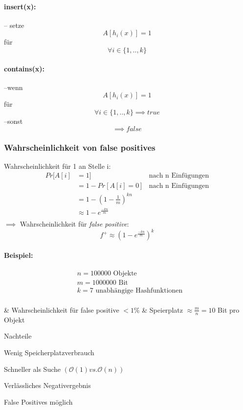 \documentclass[a4paper]{scrartcl}
\begin{document}
	\paragraph{insert(x):}
	-- setze \[A [h_i (x)] = 1 \] für \[ \forall i \in \{1,..,k \} \]
	
	\paragraph{contains(x):}
	--wenn \[ A [h_i (x)] = 1 \] für \[ \forall i \in \{1,..,k\} \implies true \] --sonst \[ \implies false \]
	
	\subsubsection{Wahrscheinlichkeit von false positives}
	Wahrscheinlichkeit für 1 an Stelle i:\\
	\begin{align*}
		Pr[A[i] &= 1] & \text{nach n Einfügungen}\\
		&= 1 - Pr[A[i] = 0] & \text{nach n Einfügungen}\\
		&= 1 - ( 1 - \frac{1}{m} )^{kn}\\
		&\approx 1 - e^{\frac{-kn}{m}}\\ 
	\end{align*}
	\(\implies\) Wahrscheinlichkeit für \emph{false positive}: \[ f^+ \approx (1 - e ^{\frac{-kn}{m}})^k \]
	
	\paragraph{Beispiel:}
	\begin{align*}
		&n = 100 000 \text{ Objekte}\\
		&m = 1 000 000 \text{ Bit} \\
		&k = 7 \text{ unabhängige Hashfunktionen}\\
	\end{align*}
	\begin{easylist}
		& Wahrscheinlichkeit für false positive \( < 1 \% \) 
		& Speierplatz \( \approx \frac{m}{n} = 10  \) Bit pro Objekt
	\end{easylist}

	\begin{labeling}{Nachteile}
		\item[\emph{Vorteile}] 
		\item[+]  Wenig Speicherplatzverbrauch
		\item[+] Schneller als Suche \( ( \mathcal{O}(1) vs. \mathcal{O}  (n)) \)
		\item[+] Verlässliches Negativergebnis
		\item[\emph{Nachteile}] 
		\item[\(-\)] False Positives möglich
	\end{labeling}
\end{document}
